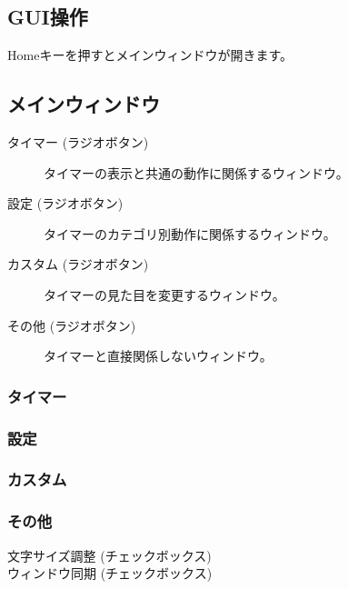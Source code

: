 \documentclass[lualatex,a4paper,fontsize=11pt,jafontscale=0.9247,titlepage,oneside]{jlreq}
\begin{document}
\subsection{GUI操作}
Homeキーを押すとメインウィンドウが開きます。
\subsection{メインウィンドウ}
\begin{description}
\item[タイマー (ラジオボタン)]タイマーの表示と共通の動作に関係するウィンドウ。
\item[設定 (ラジオボタン)]タイマーのカテゴリ別動作に関係するウィンドウ。
\item[カスタム (ラジオボタン)]タイマーの見た目を変更するウィンドウ。
\item[その他 (ラジオボタン)]タイマーと直接関係しないウィンドウ。
\end{description}
\subsubsection{タイマー}
\begin{description}
\item[]
\item[]
\end{description}
\subsubsection{設定}
\begin{description}
\item[]
\item[]
\end{description}
\subsubsection{カスタム}
\begin{description}
\item[]
\item[]
\end{description}
\subsubsection{その他}
\begin{description}
\item[文字サイズ調整 (チェックボックス)]
\item[ウィンドウ同期 (チェックボックス)]
\end{description}
\end{document}
